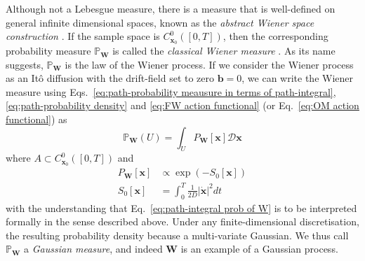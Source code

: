 
Although not a Lebesgue measure, there is a measure that is well-defined on general infinite dimensional spaces, known as the \textit{abstract Wiener space construction} \citep{grossAbstractWienerSpaces1967, MeasureIntegrationTheory1972}. If the sample space is $C_{\mathbf{x}_0}^0([0,T])$, then the corresponding probability measure $\mathbb{P}_\mathbf{W}$ is called the \textit{classical Wiener measure} \citep{cameronTransformationsWeinerIntegrals1944b, cameronTransformationsWienerIntegrals1945a}. As its name suggests, $\mathbb{P}_\mathbf{W}$ is the law of the Wiener process. If we consider the Wiener process as an It\^{o} diffusion with the drift-field set to zero $\mathbf{b} = 0$, we can write the Wiener measure using Eqs.~\ref{eq:path-probability meausure in terms of path-integral}, \ref{eq:path-probability density} and \ref{eq:FW action functional} (or Eq.~\ref{eq:OM action functional}) as
\begin{equation} \label{eq:path-integral prob of W}
\mathbb{P}_\mathbf{W}(U) = \int_U P_\mathbf{W}[\mathbf{x}] \mathcal{D} \mathbf{x}
\end{equation}
where $A \subset C_{\mathbf{x}_0}^0([0,T])$ and
\begin{subequations}
\begin{align}
P_\mathbf{W}[\mathbf{x}] & \propto \exp( - S_0[\mathbf{x}] ) \\
S_0[\mathbf{x}] & = \int_0^T \frac{1}{2D} |\dot{\mathbf{x}}|^2 dt
\end{align}
\end{subequations}
with the understanding that Eq.~\ref{eq:path-integral prob of W} is to be interpreted formally in the sense described above. Under any finite-dimensional discretisation, the resulting probability density because a multi-variate Gaussian. We thus call $\mathbb{P}_\mathbf{W}$ a \textit{Gaussian measure}, and indeed $\mathbf{W}$ is an example of a Gaussian process.

